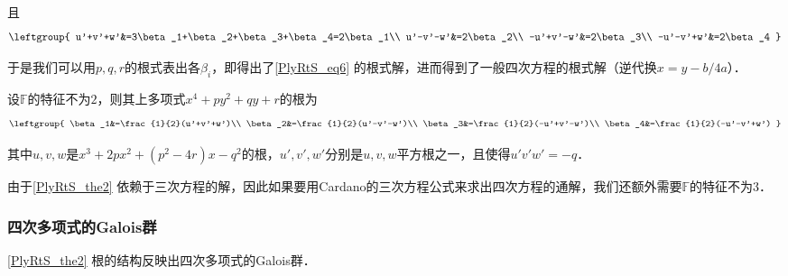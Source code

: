 且
\begin{equation}
\leftgroup{
    u'+v'+w'&=3\beta_1+\beta_2+\beta_3+\beta_4=2\beta_1\\
    u'-v'-w'&=2\beta_2\\
    -u'+v'-w'&=2\beta_3\\
    -u'-v'+w'&=2\beta_4
}
\end{equation}

于是我们可以用$p, q, r$的根式表出各$\beta_i$，即得出了\autoref{PlyRtS_eq6} 的根式解，进而得到了一般四次方程的根式解（逆代换$x=y-b/4a$）．

\begin{theorem}{}\label{PlyRtS_the2}

设$\mathbb{F}$的特征不为$2$，则其上多项式$x^4+py^2+qy+r$的根为
\begin{equation}
\leftgroup{
    \beta_1&=\frac{1}{2}(u'+v'+w')\\
    \beta_2&=\frac{1}{2}(u'-v'-w')\\
    \beta_3&=\frac{1}{2}(-u'+v'-w')\\
    \beta_4&=\frac{1}{2}(-u'-v'+w')
}
\end{equation}

其中$u, v, w$是$x^3+2px^2+(p^2-4r)x-q^2$的根，$u', v', w'$分别是$u, v, w$平方根之一，且使得$u'v'w'=-q$．

\end{theorem}

由于\autoref{PlyRtS_the2} 依赖于三次方程的解，因此如果要用Cardano的三次方程公式来求出四次方程的通解，我们还额外需要$\mathbb{F}$的特征不为$3$．


\subsubsection{四次多项式的Galois群}


\autoref{PlyRtS_the2} 根的结构反映出四次多项式的Galois群．


